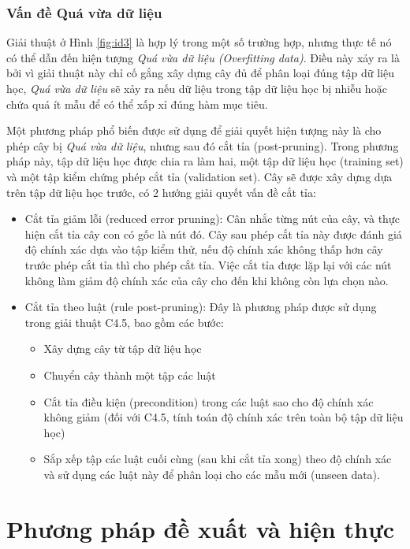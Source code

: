\documentclass[12pt]{report}
\begin{document}
			\subsection*{Vấn đề Quá vừa dữ liệu}
				\par Giải thuật ở Hình \ref{fig:id3} là hợp lý trong một số trường hợp, nhưng thực tế nó có thể dẫn đến hiện tượng \textit{Quá vừa dữ liệu (Overfitting data)}. Điều này xảy ra là bởi vì giải thuật này chỉ cố gắng xây dựng cây đủ để phân loại đúng tập dữ liệu học, \textit{Quá vừa dữ liệu} sẽ xảy ra nếu dữ liệu trong tập dữ liệu học bị nhiễu hoặc chứa quá ít mẫu để có thể xấp xỉ đúng hàm mục tiêu.
				\par Một phương pháp phổ biến được sử dụng để giải quyết hiện tượng này là cho phép cây bị \textit{Quá vừa dữ liệu}, nhưng sau đó cắt tỉa (post-pruning). Trong phương pháp này, tập dữ liệu học được chia ra làm hai, một tập dữ liệu học (training set) và một tập kiểm chứng phép cắt tỉa (validation set). Cây sẽ được xây dựng dựa trên tập dữ liệu học trước, có 2 hướng giải quyết vấn đề cắt tỉa:
				\begin{itemize}
				\item{Cắt tỉa giảm lỗi (reduced error pruning): Cân nhắc từng nút của cây, và thực hiện cắt tỉa cây con có gốc là nút đó. Cây sau phép cắt tỉa này được đánh giá độ chính xác dựa vào tập kiểm thử, nếu độ chính xác không thấp hơn cây trước phép cắt tỉa thì cho phép cắt tỉa. Việc cắt tỉa được lặp lại với các nút không làm giảm độ chính xác của cây cho đến khi không còn lựa chọn nào.}
				\item{Cắt tỉa theo luật (rule post-pruning): Đây là phương pháp được sử dụng trong giải thuật C4.5, bao gồm các bước:
					\begin{itemize}
						\item{Xây dựng cây từ tập dữ liệu học}
						\item{Chuyển cây thành một tập các luật}
						\item{Cắt tỉa điều kiện (precondition) trong các luật sao cho độ chính xác không giảm (đối với C4.5, tính toán độ chính xác trên toàn bộ tập dữ liệu học)}
						\item{Sắp xếp tập các luật cuối cùng (sau khi cắt tỉa xong) theo độ chính xác và sử dụng các luật này để phân loại cho các mẫu mới (unseen data).}
					\end{itemize}}				
				\end{itemize}

	\chapter{Phương pháp đề xuất và hiện thực}	
\end{document}
